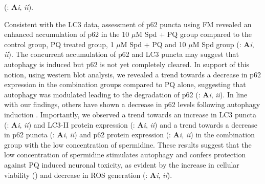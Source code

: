 (: \textbf{A}\textit{i}, \textit{ii}). 

 Consistent with the LC3 data, assessment of p62 puncta using FM revealed an enhanced accumulation of p62 in the 10 $\mu$M Spd + PQ group compared to the control group, PQ treated group, 1 $\mu$M Spd + PQ and 10 $\mu$M Spd group (: \textbf{A}\textit{i}, \textit{ii}). The concurrent accumulation of p62 and LC3 puncta may suggest that autophagy is induced but p62 is not yet completely cleared. In support of this notion, using western blot analysis, we revealed a trend towards a decrease in p62 expression in the combination groups compared to PQ alone, suggesting that autophagy was modulated leading to the degradation of p62 (: \textbf{A}\textit{i}, \textit{ii}). In line with our findings, others have shown a decrease in p62 levels following autophagy induction \citep{Bjorkoy2005,Jones2000,Zhou2017}. Importantly, we observed a trend towards an increase in LC3 puncta (: \textbf{A}\textit{i}, \textit{ii}) and LC3-II protein expression (: \textbf{A}\textit{i}, \textit{ii}) and a trend towards a decrease in p62 puncta (: \textbf{A}\textit{i}, \textit{ii}) and p62 protein expression (: \textbf{A}\textit{i}, \textit{ii}) in the combination group with the low concentration of spermidine. These results suggest that the low concentration of spermidine stimulates autophagy and confers protection against PQ induced neuronal toxicity, as evident by the increase in cellular viability () and decrease in ROS generation (: \textbf{A}\textit{i}, \textit{ii}). 

